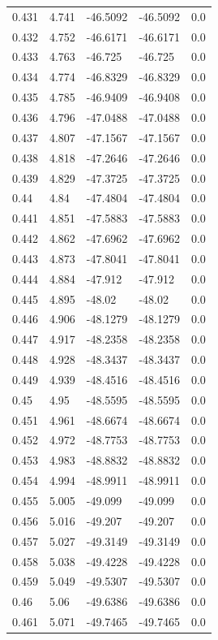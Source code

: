 \begin{table}[H]
\begin{tabular}{lllll}
0.431 & 4.741 & -46.5092 & -46.5092 & 0.0 \\
0.432 & 4.752 & -46.6171 & -46.6171 & 0.0 \\
0.433 & 4.763 & -46.725 & -46.725 & 0.0 \\
0.434 & 4.774 & -46.8329 & -46.8329 & 0.0 \\
0.435 & 4.785 & -46.9409 & -46.9408 & 0.0 \\
0.436 & 4.796 & -47.0488 & -47.0488 & 0.0 \\
0.437 & 4.807 & -47.1567 & -47.1567 & 0.0 \\
0.438 & 4.818 & -47.2646 & -47.2646 & 0.0 \\
0.439 & 4.829 & -47.3725 & -47.3725 & 0.0 \\
0.44 & 4.84 & -47.4804 & -47.4804 & 0.0 \\
0.441 & 4.851 & -47.5883 & -47.5883 & 0.0 \\
0.442 & 4.862 & -47.6962 & -47.6962 & 0.0 \\
0.443 & 4.873 & -47.8041 & -47.8041 & 0.0 \\
0.444 & 4.884 & -47.912 & -47.912 & 0.0 \\
0.445 & 4.895 & -48.02 & -48.02 & 0.0 \\
0.446 & 4.906 & -48.1279 & -48.1279 & 0.0 \\
0.447 & 4.917 & -48.2358 & -48.2358 & 0.0 \\
0.448 & 4.928 & -48.3437 & -48.3437 & 0.0 \\
0.449 & 4.939 & -48.4516 & -48.4516 & 0.0 \\
0.45 & 4.95 & -48.5595 & -48.5595 & 0.0 \\
0.451 & 4.961 & -48.6674 & -48.6674 & 0.0 \\
0.452 & 4.972 & -48.7753 & -48.7753 & 0.0 \\
0.453 & 4.983 & -48.8832 & -48.8832 & 0.0 \\
0.454 & 4.994 & -48.9911 & -48.9911 & 0.0 \\
0.455 & 5.005 & -49.099 & -49.099 & 0.0 \\
0.456 & 5.016 & -49.207 & -49.207 & 0.0 \\
0.457 & 5.027 & -49.3149 & -49.3149 & 0.0 \\
0.458 & 5.038 & -49.4228 & -49.4228 & 0.0 \\
0.459 & 5.049 & -49.5307 & -49.5307 & 0.0 \\
0.46 & 5.06 & -49.6386 & -49.6386 & 0.0 \\
0.461 & 5.071 & -49.7465 & -49.7465 & 0.0 \\

\end{tabular}
\end{table}
